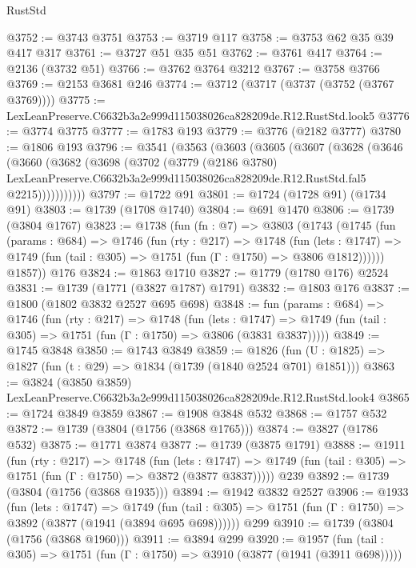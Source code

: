 \begin{lexlean}{RustStd}
\begin{coremodule}
@3752 := @3743 @3751
@3753 := @3719 @117
@3758 := @3753 @62 @35 @39 @417 @317
@3761 := @3727 @51 @35 @51
@3762 := @3761 @417
@3764 := @2136 (@3732 @51)
@3766 := @3762 @3764 @3212
@3767 := @3758 @3766
@3769 := @2153 @3681 @246
@3774 := @3712 (@3717 (@3737 (@3752 (@3767 @3769))))
@3775 := LexLeanPreserve.C6632b3a2e999d115038026ca828209de.R12.RustStd.look5
@3776 := @3774 @3775
@3777 := @1783 @193
@3779 := @3776 (@2182 @3777)
@3780 := @1806 @193
@3796 := @3541
    (@3563
      (@3603
        (@3605
          (@3607
            (@3628
              (@3646
                (@3660
                  (@3682
                    (@3698
                      (@3702
                        (@3779
                          (@2186 @3780)
                          LexLeanPreserve.C6632b3a2e999d115038026ca828209de.R12.RustStd.fal5
                          @2215)))))))))))
@3797 := @1722 @91
@3801 := @1724 (@1728 @91) (@1734 @91)
@3803 := @1739 (@1708 @1740)
@3804 := @691 @1470
@3806 := @1739 (@3804 @1767)
@3823 := @1738
    (fun (fn : @7) =>
    @3803
      (@1743
        (@1745
          (fun (params : @684) =>
          @1746
            (fun (rty : @217) =>
            @1748
              (fun (lets : @1747) =>
              @1749 (fun (tail : @305) => @1751 (fun (Γ : @1750) => @3806 @1812))))))
        @1857))
    @176
@3824 := @1863 @1710
@3827 := @1779 (@1780 @176) @2524
@3831 := @1739 (@1771 (@3827 @1787) @1791)
@3832 := @1803 @176
@3837 := @1800 (@1802 @3832 @2527 @695 @698)
@3848 := fun (params : @684) =>
  @1746
    (fun (rty : @217) =>
    @1748
      (fun (lets : @1747) =>
      @1749 (fun (tail : @305) => @1751 (fun (Γ : @1750) => @3806 (@3831 @3837)))))
@3849 := @1745 @3848
@3850 := @1743 @3849
@3859 := @1826 (fun (U : @1825) => @1827 (fun (t : @29) => @1834 (@1739 (@1840 @2524 @701) @1851)))
@3863 := @3824 (@3850 @3859) LexLeanPreserve.C6632b3a2e999d115038026ca828209de.R12.RustStd.look4
@3865 := @1724 @3849 @3859
@3867 := @1908 @3848 @532
@3868 := @1757 @532
@3872 := @1739 (@3804 (@1756 (@3868 @1765)))
@3874 := @3827 (@1786 @532)
@3875 := @1771 @3874
@3877 := @1739 (@3875 @1791)
@3888 := @1911
    (fun (rty : @217) =>
    @1748
      (fun (lets : @1747) =>
      @1749 (fun (tail : @305) => @1751 (fun (Γ : @1750) => @3872 (@3877 @3837)))))
    @239
@3892 := @1739 (@3804 (@1756 (@3868 @1935)))
@3894 := @1942 @3832 @2527
@3906 := @1933
    (fun (lets : @1747) =>
    @1749 (fun (tail : @305) => @1751 (fun (Γ : @1750) => @3892 (@3877 (@1941 (@3894 @695 @698))))))
    @299
@3910 := @1739 (@3804 (@1756 (@3868 @1960)))
@3911 := @3894 @299
@3920 := @1957
    (fun (tail : @305) => @1751 (fun (Γ : @1750) => @3910 (@3877 (@1941 (@3911 @698)))))

\end{coremodule}
\end{lexlean}
